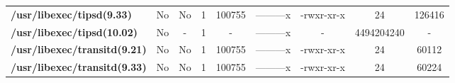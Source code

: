 \begin{center}
{\begin{tabular}{|>{\bfseries} l | C | C | C | C | C | C | C | C |}
					/usr/libexec/tipsd(9.33) & No & No & \color{green}1 & \color{red}100755 & \color{green}---------x & \color{red}-rwxr-xr-x & \color{green}24 & \color{red}126416\\ 
					/usr/libexec/tipsd(10.02) & No & - & 1 & - & ---------x & - & 4494204240 & -\\ 
					/usr/libexec/transitd(9.21) & No & No & \color{green}1 & \color{red}100755 & \color{green}---------x & \color{red}-rwxr-xr-x & \color{green}24 & \color{red}60112\\ 
					/usr/libexec/transitd(9.33) & No & No & \color{green}1 & \color{red}100755 & \color{green}---------x & \color{red}-rwxr-xr-x & \color{green}24 & \color{red}60224\\ 

			\end{tabular}
		}
	\end{center}



